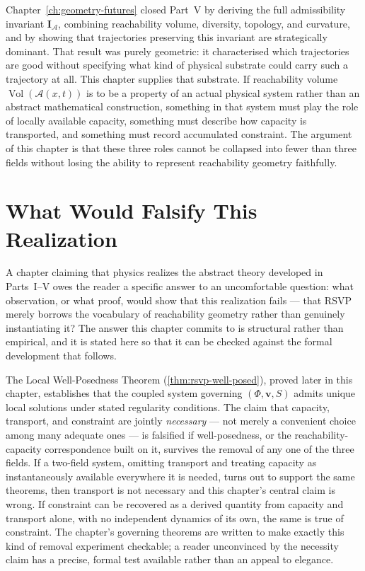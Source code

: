 \documentclass[12pt,twoside,openright]{book}
\newcommand{\adm}{\mathcal{A}}
\newcommand{\Vol}{\operatorname{Vol}}
\begin{document}
Chapter~\ref{ch:geometry-futures} closed Part~V by deriving
the full admissibility invariant $\mathbf{I}_\adm$, combining
reachability volume, diversity, topology, and curvature, and
by showing that trajectories preserving this invariant are
strategically dominant. That result was purely geometric: it
characterised which trajectories are good without specifying
what kind of physical substrate could carry such a trajectory
at all. This chapter supplies that substrate. If reachability
volume $\Vol(\adm(x,t))$ is to be a property of an actual
physical system rather than an abstract mathematical
construction, something in that system must play the role of
locally available capacity, something must describe how
capacity is transported, and something must record
accumulated constraint. The argument of this chapter is that
these three roles cannot be collapsed into fewer than three
fields without losing the ability to represent reachability
geometry faithfully.

\section{What Would Falsify This Realization}
\label{sec:ch16-falsifiability}

A chapter claiming that physics realizes the abstract theory
developed in Parts~I--V owes the reader a specific answer to
an uncomfortable question: what observation, or what proof,
would show that this realization fails --- that RSVP merely
borrows the vocabulary of reachability geometry rather than
genuinely instantiating it? The answer this chapter commits
to is structural rather than empirical, and it is stated here
so that it can be checked against the formal development that
follows.

The Local Well-Posedness Theorem
(\cref{thm:rsvp-well-posed}), proved later in this chapter,
establishes that the coupled system governing
$(\Phi,\mathbf{v},S)$ admits unique local solutions under
stated regularity conditions. The claim that capacity,
transport, and constraint are jointly \emph{necessary} ---
not merely a convenient choice among many adequate ones --- is
falsified if well-posedness, or the reachability-capacity
correspondence built on it, survives the removal of any one
of the three fields. If a two-field system, omitting transport
and treating capacity as instantaneously available everywhere
it is needed, turns out to support the same theorems, then
transport is not necessary and this chapter's central claim is
wrong. If constraint can be recovered as a derived quantity
from capacity and transport alone, with no independent
dynamics of its own, the same is true of constraint. The
chapter's governing theorems are written to make exactly this
kind of removal experiment checkable; a reader unconvinced by
the necessity claim has a precise, formal test available
rather than an appeal to elegance.
\end{document}
